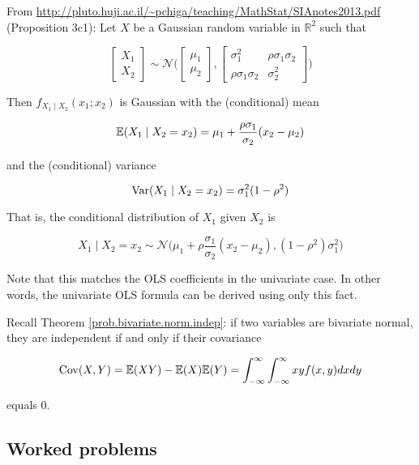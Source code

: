 \begin{proposition}\label{prob.cond.bivar.norm.dist}

From \url{http://pluto.huji.ac.il/~pchiga/teaching/MathStat/SIAnotes2013.pdf} (Proposition 3c1): Let \(X\) be a Gaussian random variable in \(\mathbb{R}^2\) such that

\[
\begin{bmatrix} X_1 \\ X_2 \end{bmatrix}  \sim \mathcal{N}\bigg(\begin{bmatrix} \mu_1 \\ \mu_2 \end{bmatrix}, \begin{bmatrix} \sigma_1^2 & \rho \sigma_1 \sigma_2 \\  \rho \sigma_1 \sigma_2 & \sigma_2^2 \end{bmatrix}  \bigg)
\]

Then \(f_{X_1 \mid X_2}(x_1; x_2)\) is Gaussian with the (conditional) mean

\[
\E(X_1 \mid X_2 = x_2) = \mu_1 + \frac{\rho \sigma_1}{\sigma_2} (x_2 - \mu_2)
\]

and the (conditional) variance

\[
\Var(X_1 \mid X_2 = x_2) = \sigma_1^2 (1 - \rho^2)
\]

That is, the conditional distribution of \(X_1\) given \(X_2\) is

\[
X_1 \mid X_2 = x_2 \sim \mathcal{N} \bigg( \mu_1 + \rho \frac{\sigma_1}{\sigma_2}(x_2 - \mu_2), (1 - \rho^2)\sigma_1^2 \bigg) 
\]
\end{proposition} 

\begin{remark}Note that this matches the OLS coefficients in the univariate case. In other words, the univariate OLS formula can be derived using only this fact.\end{remark}

Recall Theorem \ref{prob.bivariate.norm.indep}: if two variables are bivariate normal, they are independent if and only if their covariance 

\[
\Cov(X, Y) = \E(XY) - \E(X)\E(Y) = \int_{-\infty}^\infty \int_{-\infty}^\infty xy f(x, y) dx dy
\] 

equals 0. 


%
%
%
%
%
%
%
\subsection{Worked problems}

